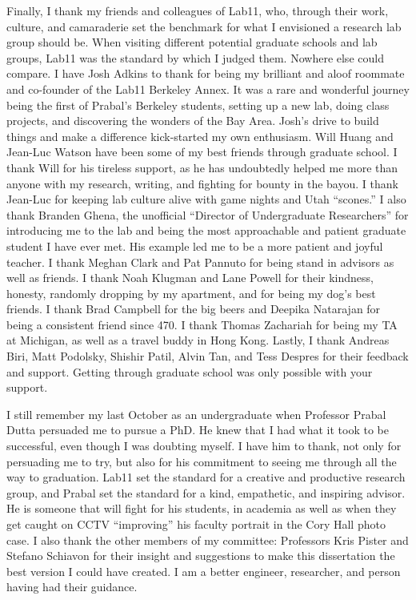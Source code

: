 \begin{acknowledgements}
Finally, I thank my friends and colleagues of Lab11, who, through their work, culture, and camaraderie set the benchmark for what I envisioned a research lab group should be.
When visiting different potential graduate schools and lab groups, Lab11 was the standard by which I judged them. Nowhere else could compare.
I have Josh Adkins to thank for being my brilliant and aloof roommate and co-founder of the Lab11 Berkeley Annex.
It was a rare and wonderful journey being the first of Prabal's Berkeley students, setting up a new lab, doing class projects, and discovering the wonders of the Bay Area. Josh's drive to build things and make a difference kick-started my own enthusiasm.
Will Huang and Jean-Luc Watson have been some of my best friends through graduate school.
I thank Will for his tireless support, as he has undoubtedly helped me more than anyone with my research, writing, and fighting for bounty in the bayou. 
I thank Jean-Luc for keeping lab culture alive with game nights and Utah ``scones.'' 
I also thank Branden Ghena, the unofficial ``Director of Undergraduate Researchers'' for introducing me to the lab and being the most approachable and patient graduate student I have ever met. 
His example led me to be a more patient and joyful teacher. 
I thank Meghan Clark and Pat Pannuto for being stand in advisors as well as friends.
I thank Noah Klugman and Lane Powell for their kindness, honesty, randomly dropping by my apartment, and for being my dog's best friends.
I thank Brad Campbell for the big beers and Deepika Natarajan for being a consistent friend since 470. 
I thank Thomas Zachariah for being my TA at Michigan, as well as a travel buddy in Hong Kong.
Lastly, I thank Andreas Biri, Matt Podolsky, Shishir Patil, Alvin Tan, and Tess Despres for their feedback and support.
Getting through graduate school was only possible with your support. 

I still remember my last October as an undergraduate when Professor Prabal Dutta persuaded me to pursue a PhD.
He knew that I had what it took to be successful, even though I was doubting myself. 
I have him to thank, not only for persuading me to try, but also for his commitment to seeing me through all the way to graduation.
Lab11 set the standard for a creative and productive research group, and Prabal set the standard for a kind, empathetic, and inspiring advisor.
He is someone that will fight for his students, in academia as well as when they get caught on CCTV ``improving'' his faculty portrait in the Cory Hall photo case.
I also thank the other members of my committee: Professors Kris Pister and Stefano Schiavon for their insight and suggestions to make this dissertation the best version I could have created. 
I am a better engineer, researcher, and person having had their guidance.





\end{acknowledgements}
